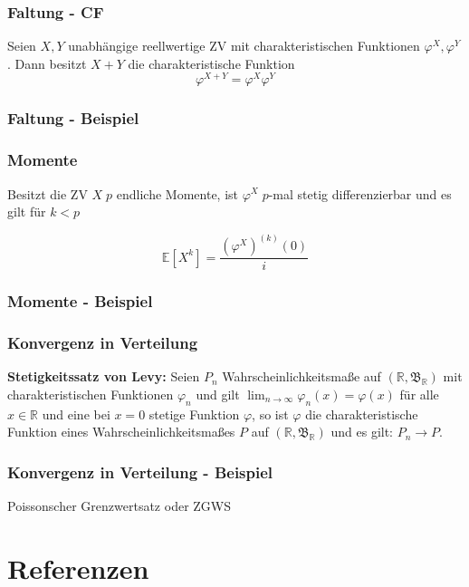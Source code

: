 \documentclass{beamer}
\newcommand{\R}{\mathbb{R}}
\newcommand{\E}{\mathbb{E}}
\begin{document}
\begin{frame}
\frametitle{Faltung - CF}
  Seien $X, Y$ unabhängige reellwertige ZV mit charakteristischen Funktionen $\varphi^X, \varphi^Y$. Dann besitzt $X + Y$ die charakteristische Funktion
$$\varphi^{X+Y} = \varphi^X \varphi^Y$$
\end{frame}

\begin{frame}
\frametitle{Faltung - Beispiel}

\end{frame}

\begin{frame}
\frametitle{Momente}
Besitzt die ZV $X \; p$ endliche Momente, ist $\varphi^X \; p$-mal stetig differenzierbar und es gilt für $k < p$

\begin{equation*}
\E[X^k] = \frac{(\varphi^X)^{(k)}(0)}{i}
\end{equation*}
\end{frame}

\begin{frame}
\frametitle{Momente - Beispiel}
\end{frame}

\begin{frame}
\frametitle{Konvergenz in Verteilung}
\textbf{Stetigkeitssatz von Levy:} \hfill \newline
Seien $P_n$ Wahrscheinlichkeitsmaße auf $(\R, \mathfrak{B}_\R)$ mit charakteristischen Funktionen $\varphi_n$ und gilt $\lim_{n \to \infty} \varphi_n (x) = \varphi(x)$ für alle $x \in \R$ und eine bei $x = 0$ stetige Funktion $\varphi$, so ist $\varphi$ die charakteristische Funktion eines Wahrscheinlichkeitsmaßes $P$ auf $(\R, \mathfrak{B}_\R)$ und es gilt: $P_n \to P$.
\end{frame}

\begin{frame}
\frametitle{Konvergenz in Verteilung - Beispiel}
Poissonscher Grenzwertsatz oder ZGWS
\end{frame}

\begin{frame}
\frametitle{}
\end{frame}

\begin{frame}
\frametitle{}
\end{frame}


\section*{Referenzen}

\end{document}
